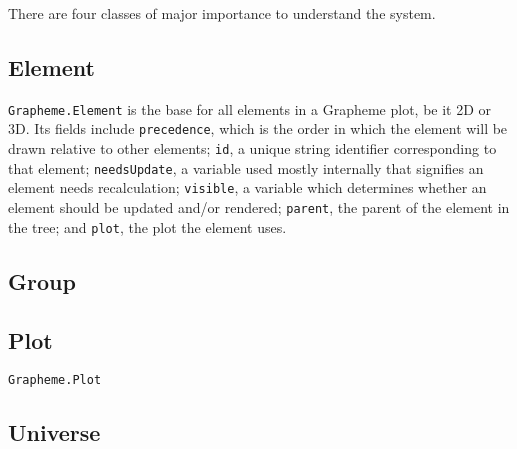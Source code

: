 \documentclass{article}
\begin{document}
There are four classes of major importance to understand the system.

\subsection{Element}

\texttt{Grapheme.Element} is the base for all elements in a Grapheme plot, be it 2D or 3D. Its fields include \texttt{precedence}, which is the order in which the element will be drawn relative to other elements; \texttt{id}, a unique string identifier corresponding to that element; \texttt{needsUpdate}, a variable used mostly internally that signifies an element needs recalculation; \texttt{visible}, a variable which determines whether an element should be updated and/or rendered; \texttt{parent}, the parent of the element in the tree; and \texttt{plot}, the plot the element uses.

\subsection{Group}

\subsection{Plot}

\texttt{Grapheme.Plot}

\subsection{Universe}
\end{document}
